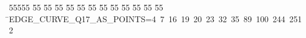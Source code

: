 %
%
\begin{tabbing}
55555 \= 55 \= 55 \= 55 \= 55 \= 55 \= 55 \= 55 \= 55 \= 55 \= 55 \= 55 \= 55 \= \>EDGE\_CURVE\_Q17\_AS\_POINTS=4\ 7\ 16\ 19\ 20\ 23\ 32\ 35\ 89\ 100\ 244\ 251\\[0pt]
2\>\end{tabbing}
